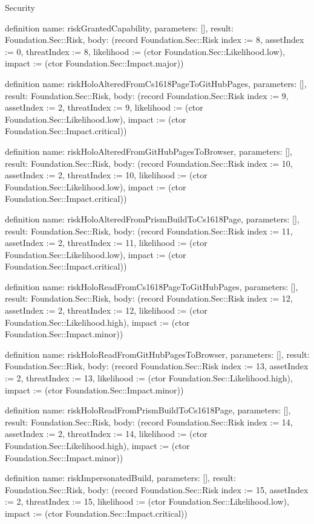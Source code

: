 \begin{lexlean}{Security}
\begin{semanticmodule}
definition{
  name: riskGrantedCapability,
  parameters: [],
  result: Foundation.Sec::Risk,
  body: (record Foundation.Sec::Risk {index := 8, assetIndex := 0, threatIndex := 8, likelihood := (ctor Foundation.Sec::Likelihood.low), impact := (ctor Foundation.Sec::Impact.major)})
}

definition{
  name: riskHoloAlteredFromCs1618PageToGitHubPages,
  parameters: [],
  result: Foundation.Sec::Risk,
  body: (record Foundation.Sec::Risk {index := 9, assetIndex := 2, threatIndex := 9, likelihood := (ctor Foundation.Sec::Likelihood.low), impact := (ctor Foundation.Sec::Impact.critical)})
}

definition{
  name: riskHoloAlteredFromGitHubPagesToBrowser,
  parameters: [],
  result: Foundation.Sec::Risk,
  body: (record Foundation.Sec::Risk {index := 10, assetIndex := 2, threatIndex := 10, likelihood := (ctor Foundation.Sec::Likelihood.low), impact := (ctor Foundation.Sec::Impact.critical)})
}

definition{
  name: riskHoloAlteredFromPrismBuildToCs1618Page,
  parameters: [],
  result: Foundation.Sec::Risk,
  body: (record Foundation.Sec::Risk {index := 11, assetIndex := 2, threatIndex := 11, likelihood := (ctor Foundation.Sec::Likelihood.low), impact := (ctor Foundation.Sec::Impact.critical)})
}

definition{
  name: riskHoloReadFromCs1618PageToGitHubPages,
  parameters: [],
  result: Foundation.Sec::Risk,
  body: (record Foundation.Sec::Risk {index := 12, assetIndex := 2, threatIndex := 12, likelihood := (ctor Foundation.Sec::Likelihood.high), impact := (ctor Foundation.Sec::Impact.minor)})
}

definition{
  name: riskHoloReadFromGitHubPagesToBrowser,
  parameters: [],
  result: Foundation.Sec::Risk,
  body: (record Foundation.Sec::Risk {index := 13, assetIndex := 2, threatIndex := 13, likelihood := (ctor Foundation.Sec::Likelihood.high), impact := (ctor Foundation.Sec::Impact.minor)})
}

definition{
  name: riskHoloReadFromPrismBuildToCs1618Page,
  parameters: [],
  result: Foundation.Sec::Risk,
  body: (record Foundation.Sec::Risk {index := 14, assetIndex := 2, threatIndex := 14, likelihood := (ctor Foundation.Sec::Likelihood.high), impact := (ctor Foundation.Sec::Impact.minor)})
}

definition{
  name: riskImpersonatedBuild,
  parameters: [],
  result: Foundation.Sec::Risk,
  body: (record Foundation.Sec::Risk {index := 15, assetIndex := 2, threatIndex := 15, likelihood := (ctor Foundation.Sec::Likelihood.low), impact := (ctor Foundation.Sec::Impact.critical)})
}


\end{semanticmodule}
\end{lexlean}
